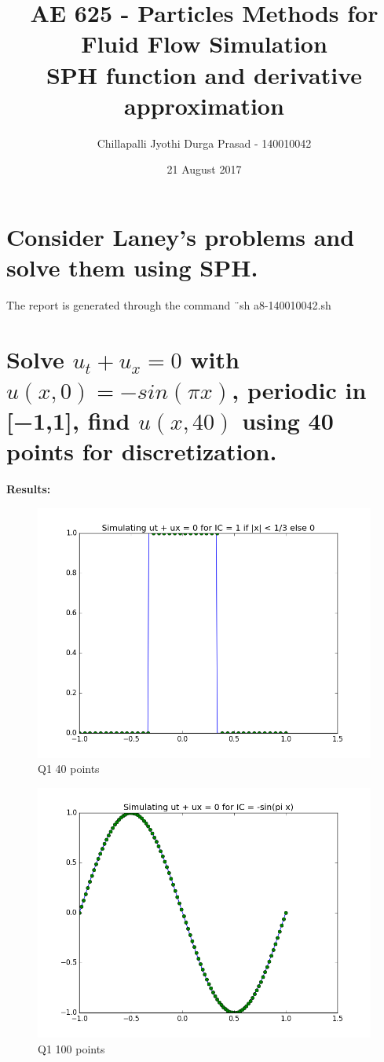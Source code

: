 \documentclass[a4paper,11pt]{article}
\title{AE 625 - Particles Methods for Fluid Flow Simulation \\ SPH function and derivative approximation}
\author{Chillapalli Jyothi Durga Prasad - 140010042 }
\date{21 August 2017}
\begin{document}
\maketitle


\tableofcontents
\listoffigures


\newpage
\section*{Consider Laney's problems and solve them using SPH.}
\indent The report is generated through the command \"\ sh a8-140010042.sh \"\\

\section{Solve $u_t+u_x=0$ with $u(x,0)=−sin(\pi x)$, periodic in [−1,1], find $u(x,40)$ using 40 points for discretization.\\}


\textbf{Results:}\\

\begin{figure}[ht]
    \centering
    \includegraphics[width=.8\linewidth]{q2_40.png}
    \caption{Q1 40 points}
    \label{fig:ex1}    
\end{figure}

\begin{figure}[ht]
    \centering
    \includegraphics[width=.8\linewidth]{q1_100.png}
    \caption{Q1 100 points}
    \label{fig:ex2}    
\end{figure}
\newpage
\indent\\
\newpage
\end{document}
